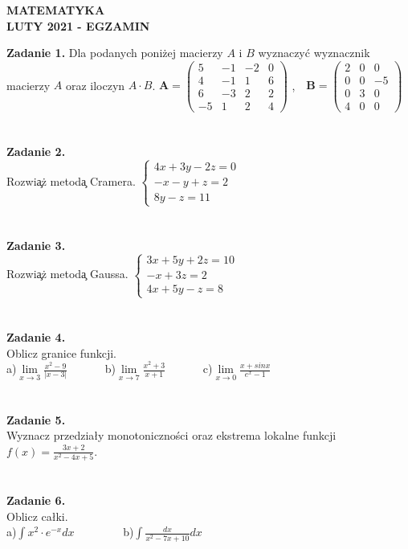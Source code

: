 \documentclass{report}
\begin{document}
\begin{center}
\textbf{MATEMATYKA \\LUTY 2021 - EGZAMIN}
\end{center}
\textbf{Zadanie 1.} 
Dla podanych poniżej macierzy $A$ i $B$ wyznaczyć wyznacznik macierzy $A$ oraz iloczyn $A\cdot B$.
\newline\vspace{1cm}
$
\mathbf{A} =
\left( \begin{array}{cccc}
5 & -1& -2 & 0\\
4 & -1&1 & 6\\
6 & -3& 2 & 2\\
-5 & 1 & 2 & 4 
\end{array} \right)
$ ,\ \ 
$
\mathbf{B} =
\left( \begin{array}{ccc}
2 & 0& 0\\
0 & 0& -5\\
0 & 3& 0\\
4 & 0& 0
\end{array} \right)
$
\\\\\\\textbf{Zadanie 2.} 
\\Rozwi\c{a}\.z metod\c{a} Cramera. 
$
\left\{ \begin{array}{ll}
4x+3y-2z=0\\
-x-y+z=2\\
8y-z=11
\end{array} \right.
$
\\\\\\\textbf{Zadanie 3.} 
\\Rozwi\c{a}\.z metod\c{a} Gaussa. 
$
\left\{ \begin{array}{ll}
3x+5y+2z=10\\
-x+3z=2\\
4x+5y-z=8
\end{array} \right.
$
\\\\\\\textbf{Zadanie 4.}
\\Oblicz granice funkcji.
\\a)$\lim\limits_{x\to 3}\frac{x^2-9}{\vert x-3\vert}$
\ \ \ \ \ \  b)$\lim\limits_{x\to 7}\frac{x^2+3}{x+1}$
\ \ \ \ \ \ c)$\lim\limits_{x\to 0} \frac{x+sinx}{e^x-1}$
\\\\\\\textbf{Zadanie 5.}
\\Wyznacz przedziały monotoniczności oraz ekstrema lokalne funkcji $f(x)=\frac{3x+2}{x^2-4x+5}$.
\\\\\\\textbf{Zadanie 6.}
\\Oblicz całki. 
\\a)$\int x^2\cdot e^{-x} dx$ \ \ \ \ \ \ \ \ b)$\int \frac{dx}{x^2-7x+10} dx$
\end{document}
